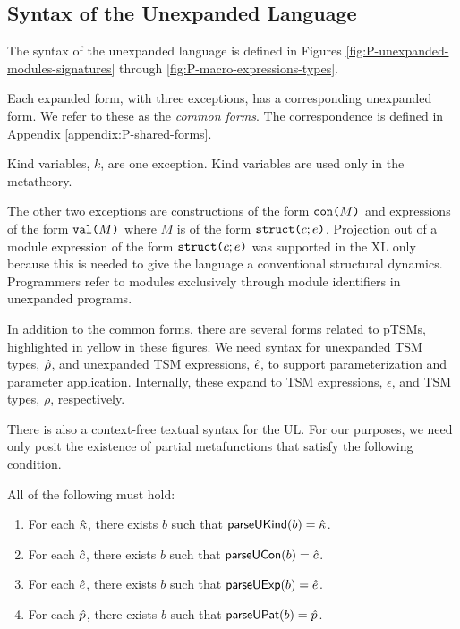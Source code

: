 \subsection{Syntax of the Unexpanded Language}
The syntax of the unexpanded language is defined in Figures \ref{fig:P-unexpanded-modules-signatures} through \ref{fig:P-macro-expressions-types}.

Each expanded form, with three exceptions, has a corresponding unexpanded form. We refer to these as the \emph{common forms}. The correspondence is defined in Appendix \ref{appendix:P-shared-forms}.

Kind variables, $k$, are one exception. Kind variables are used only in the metatheory.

The other two exceptions are constructions of the form $\texttt{con}\texttt{(}M\texttt{)}$ and expressions of the form $\texttt{val}\texttt{(}M\texttt{)}$ where $M$ is of the form $\texttt{struct}\texttt{(}c; e\texttt{)}$. Projection out of a module expression of the form $\texttt{struct}\texttt{(}c; e\texttt{)}$ was supported in the XL only because this is needed to give the language  a conventional structural dynamics. Programmers refer to modules exclusively through module identifiers in unexpanded programs. 

In addition to the common forms, there are several forms related to pTSMs, highlighted in yellow in these figures. We need syntax for unexpanded TSM types, ${\hat\rho}$, and unexpanded TSM expressions, ${\hat\epsilon}$, to support parameterization and parameter application. Internally, these expand to TSM expressions, $\epsilon$, and TSM types, $\rho$, respectively.

There is also a context-free textual syntax for the UL. For our purposes, we need only posit the existence of partial metafunctions that satisfy the following condition. 
\begingroup
\def\thetheorem{\ref{condition:textual-representability-P}}
\begin{condition} All of the following must hold:
\begin{enumerate}
\item For each ${\hat\kappa}$, there exists $b$ such that $\mathsf{parseUKind}(b)={\hat\kappa}$.
\item For each ${\hat c}$, there exists $b$ such that $\mathsf{parseUCon}(b)={\hat c}$.
\item For each ${\hat e}$, there exists $b$ such that $\mathsf{parseUExp}(b)={\hat e}$.
\item For each $\hat{p}$, there exists $b$ such that $\mathsf{parseUPat}(b)=\hat{p}$.
\end{enumerate}
\end{condition}
\endgroup


